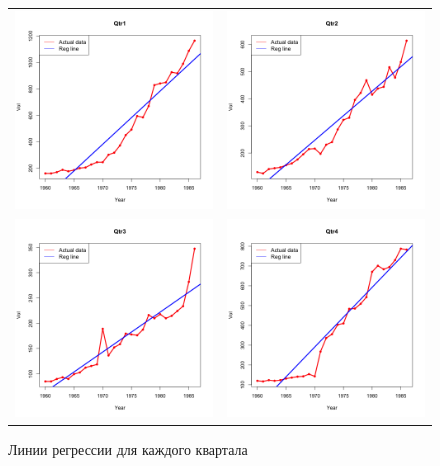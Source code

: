 \documentclass[]{article}
\numberwithin{equation}{section}
\begin{document}
    \begin{figure}[H]
        \centering
        \begin{tabular}{c c}
            \includegraphics[width = 0.4\linewidth]{data/UKgas_reg_line_qtr1.png} & \includegraphics[width = 0.4\linewidth]{data/UKgas_reg_line_qtr2.png} \\
            \includegraphics[width = 0.4\linewidth]{data/UKgas_reg_line_qtr3.png} & \includegraphics[width = 0.4\linewidth]{data/UKgas_reg_line_qtr4.png}
        \end{tabular}
        \vspace{-0.5cm}
        \caption{Линии регрессии для каждого квартала}
    \end{figure}
\end{document}

